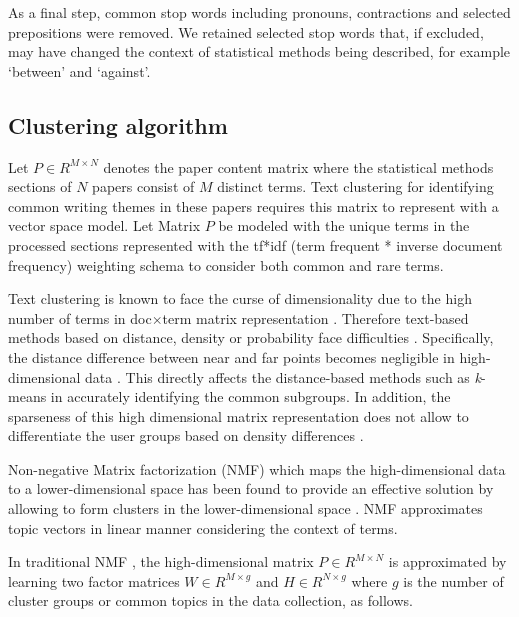 \documentclass[12pt]{article}
\begin{document}
As a final step, common stop words including pronouns, contractions and
selected prepositions were removed. We retained selected stop words
that, if excluded, may have changed the context of statistical methods
being described, for example `between' and `against'.

\subsection{Clustering algorithm}

Let \(P \in R^{M \times N}\) denotes the paper content matrix where the
statistical methods sections of \(N\) papers consist of \(M\) distinct
terms. Text clustering for identifying common writing themes in these
papers requires this matrix to represent with a vector space model. Let
Matrix \(P\) be modeled with the unique terms in the processed sections
represented with the tf*idf (term frequent * inverse document frequency)
weighting schema to consider both common and rare terms.

Text clustering is known to face the curse of dimensionality due to the
high number of terms in doc\(\times\)term matrix representation
\citep{sutanto2018fine,aggarwal2012mining}. Therefore
text-based methods based on distance, density or probability face
difficulties
\citep{mohotti2018corpus,mohotti2019concept,park2018examining}.
Specifically, the distance difference between near and far points
becomes negligible in high-dimensional data \citep{aggarwal2012mining}.
This directly affects the distance-based methods such as
\textit{k}-means \citep{jain} in accurately identifying the common
subgroups. In addition, the sparseness of this high dimensional matrix
representation does not allow to differentiate the user groups based on
density differences
\citep{mohotti2018efficient,mohotti2018corpus}.

Non-negative Matrix factorization (NMF) which maps the high-dimensional
data to a lower-dimensional space has been found to provide an effective
solution by allowing to form clusters in the lower-dimensional space
\citep{luong2019clustering,kim2014algorithms}. NMF approximates
topic vectors in linear manner considering the context of terms.

In traditional NMF \citep{aggarwal2012mining}, the high-dimensional
matrix \(P \in R^{M \times N}\) is approximated by learning two factor
matrices \(W \in R^{M \times g}\) and \(H \in R ^{N \times g}\) where
\(g\) is the number of cluster groups or common topics in the data
collection, as follows.
\end{document}
